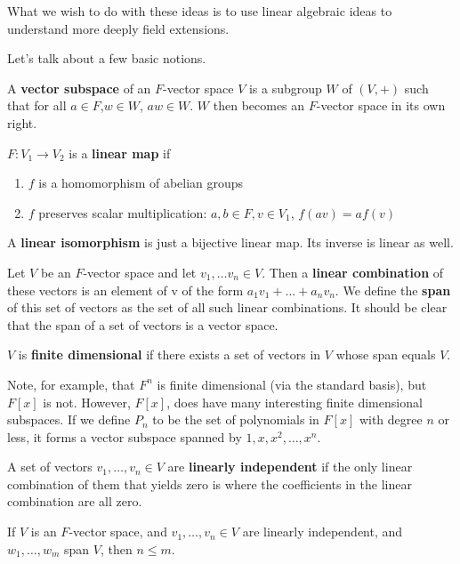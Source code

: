 \documentclass{../mathnotes}
\begin{document}
What we wish to do with these ideas is to use linear algebraic ideas to understand more deeply field extensions.

Let's talk about a few basic notions.
\begin{defn}
    A \textbf{vector subspace} of an $F$-vector space $V$ is a subgroup $W$ of $(V,+)$ such that for all $a\in F$,$w\in W$, $aw\in W$.
    $W$ then becomes an $F$-vector space in its own right.
\end{defn}

\begin{defn}
    $F:V_1\to V_2$ is a \textbf{linear map} if
    \begin{enumerate}
        \item $f$ is a homomorphism of abelian groups
        \item $f$ preserves scalar multiplication: $a,b\in F, v\in V_1$, $f(av)=af(v)$
    \end{enumerate}
    A \textbf{linear isomorphism} is just a bijective linear map. Its inverse is linear as well.
\end{defn}

\begin{defn}
    Let $V$ be an $F$-vector space and let $v_1,\ldots v_n\in V$. Then a \textbf{linear combination} of these vectors is
    an element of v of the form $a_1v_1 + \ldots + a_nv_n$. We define the \textbf{span} of this set of vectors as the set of all such linear combinations.
    It should be clear that the span of a set of vectors is a vector space.
\end{defn}

\begin{defn}
    $V$ is \textbf{finite dimensional} if there exists a set of vectors in $V$ whose span equals $V$.
\end{defn}
Note, for example, that $F^n$ is finite dimensional (via the standard basis), but $F[x]$ is not. However, $F[x]$, does have many
interesting finite dimensional subspaces. If we define $P_n$ to be the set of polynomials in $F[x]$ with degree $n$ or less, it 
forms a vector subspace spanned by $1, x, x^2, \ldots, x^n$.

\begin{defn}
    A set of vectors $v_1, \ldots, v_n\in V$ are \textbf{linearly independent} if the only linear combination of them that yields
    zero is where the coefficients in the linear combination are all zero.
\end{defn}

\begin{thm}
    If $V$ is an $F$-vector space, and $v_1,\ldots, v_n\in V$ are linearly independent, and $w_1,\ldots, w_m$ span $V$, then
    $n\leq m$.
\end{thm}
\end{document}
